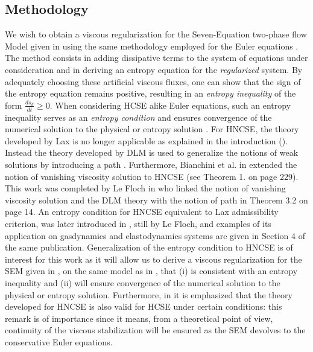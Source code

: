 \subsection{Methodology}
%
We wish to obtain a viscous regularization for the Seven-Equation two-phase flow Model given in  using the same methodology 
employed for the Euler equations \cite{jlg,Marco_paper_low_mach}. The method consists in adding dissipative terms to the system of equations under 
consideration and in deriving an entropy equation for the {\it regularized} system. By adequately choosing these artificial viscous fluxes, one can 
show that the sign of the entropy equation remains positive, resulting in an \emph{entropy inequality} of the form $\frac{d s_k}{dt} \geq 0$. When considering 
HCSE alike Euler equations, such an entropy inequality serves as an \emph{entropy condition} and ensures convergence of the numerical solution to
the physical or entropy solution \cite{Lax}. For HNCSE, the theory developed by Lax \cite{Lax} is no longer applicable as explained in the introduction ().
Instead the theory developed by DLM \cite{dlm} is used to generalize the notions of weak solutions by introducing a path \cite{dlm}. Furthermore, Bianchini et al. in \cite{bianchini_bressan_2005} extended the notion of vanishing viscosity solution to HNCSE (see Theorem 1. on page 229). This work was completed by 
Le Floch in \cite{lefloch_1989} who linked the notion of vanishing viscosity solution and the DLM theory with the notion of path in Theorem 3.2 on page 14. 
An entropy condition for HNCSE equivalent to Lax admissibility criterion, was later introduced in \cite{lefloch_1988}, still by Le Floch, and 
examples of its application on gasdynamics and elastodynamics systems are given in Section 4 of the same publication. Generalization of the entropy
condition to HNCSE is of interest for this work as it will allow us to derive a viscous regularization for the SEM given in , 
on the same model as in \cite{jlg,Marco_paper_low_mach}, that (i) is consistent with an entropy inequality and (ii) will ensure convergence of the numerical 
solution to the physical or entropy solution. Furthermore, in \cite{dlm, bianchini_bressan_2005, lefloch_1989} it is emphasized that the theory developed 
for HNCSE is also valid for HCSE under certain conditions: this remark is of importance since it means, from a theoretical point of view, 
continuity of the viscous stabilization will be ensured as the SEM devolves to the conservative Euler equations. 

